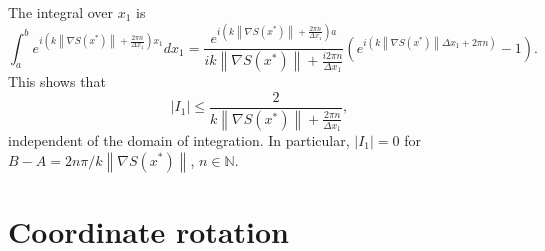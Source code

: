 \documentclass{article}
\newcommand{\norm}[1]{\left\lVert#1\right\rVert}
\theoremstyle{plain}
\begin{document}

The integral over $x_1$ is
\begin{equation}
	\int_a^b e^{ i\left( k\norm{\nabla S(x^*)} + \frac{2\pi n}{ \Delta x_1 }\right) x_1 } dx_1
	= \frac{e^{ i\left( k\norm{\nabla S(x^*)} + \frac{2\pi n}{ \Delta x_1 }\right) a } }{ ik\norm{\nabla S(x^*)} + \frac{i2\pi n}{ \Delta x_1 } }
	\left( e^{ i\left( k\norm{\nabla S(x^*)}\Delta x_1 + 2\pi n \right)  } - 1 \right).
\end{equation}
This shows that
\begin{equation}
	|I_1| \leq \frac{2}{k\norm{\nabla S(x^*)} + \frac{2\pi n}{ \Delta x_1 }},
\end{equation}
independent of the domain of integration.
In particular, $|I_1| = 0$ for $B-A = 2n\pi / k\norm{\nabla S(x^*)}$, $n\in\mathbb{N}$.






\section{Coordinate rotation}\label{sec_rotation}
\end{document}
